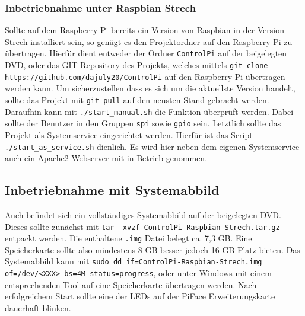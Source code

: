  \subsubsection{Inbetriebnahme unter Raspbian Strech}
 Sollte auf dem Raspberry Pi bereits ein Version von Raspbian in der Version Strech installiert sein, so genügt es den Projektordner auf den Raspberry Pi zu übertragen. Hierfür dient entweder der Ordner \texttt{ControlPi} auf der beigelegten DVD, oder das GIT Repository des Projekts, welches mittels  \texttt{git clone https://github.com/dajuly20/ControlPi} auf den Raspberry Pi übertragen werden kann. Um sicherzustellen dass es sich um die aktuellste Version handelt, sollte das Projekt mit \texttt{git pull} auf den neusten Stand gebracht werden. Daraufhin kann mit \texttt{./start\_manual.sh} die Funktion überprüft werden. Dabei sollte der Benutzer in den Gruppen \texttt{spi} sowie \texttt{gpio} sein. Letztlich sollte das Projekt als Systemservice eingerichtet werden. Hierfür ist das Script \texttt{./start\_as\_service.sh} dienlich. Es wird hier neben dem eigenen Systemservice auch ein Apache2 Webserver mit in Betrieb genommen.
 
 \subsection{Inbetriebnahme mit Systemabbild}
 Auch befindet sich ein vollständiges Systemabbild \cite{URL:Image} auf der beigelegten DVD. Dieses sollte zunächst mit \texttt{tar -xvzf ControlPi-Raspbian-Strech.tar.gz} entpackt werden. Die enthaltene \texttt{.img} Datei belegt ca. 7,3 GB. Eine Speicherkarte sollte also mindestens 8 GB besser jedoch 16 GB Platz bieten. Das Systemabbild kann mit \texttt{sudo dd if=ControlPi-Raspbian-Strech.img of=/dev/<XXX> bs=4M status=progress}, oder unter Windows mit einem entsprechenden Tool \cite{URL:Win32DiskImager} auf eine Speicherkarte übertragen werden. Nach erfolgreichem Start sollte eine der LEDs auf der PiFace Erweiterungskarte dauerhaft blinken.  
 
